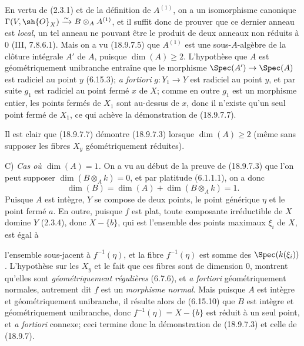 En vertu de (2.3.1) et de la définition de $A^{(1)}$, on a un isomorphisme canonique $\Gamma(V,\sh{O}_X)\xrightarrow{\sim}B\otimes_A A^{(1)}$, et il suffit donc de prouver que ce dernier anneau est \emph{local}, un tel anneau ne pouvant être le produit de deux anneaux non réduits à 0 (III, 7.8.6.1). Mais on a vu (18.9.7.5) que $A^{(1)}$ est une sous-$A$-algèbre de la clôture intégrale $A'$ de $A$, puisque $\dim(A)\geq 2$. L'hypothèse que $A$ est géométriquement unibranche entraîne que le morphisme $\Spec(A')\to\Spec(A)$ est radiciel au point $y$ (6.15.3); \emph{a fortiori} $g:Y_1\to Y$ est radiciel au point $y$, et par suite $g_1$ est radiciel au point fermé $x$ de $X$; comme en outre $g_1$ est un morphisme entier, les points fermés de $X_1$ sont au-dessus de $x$, donc il n'existe qu'un seul point fermé de $X_1$, ce qui achève la démonstration de (18.9.7.7).

Il est clair que (18.9.7.7) démontre (18.9.7.3) lorsque $\dim(A)\geq 2$ (même sans supposer les fibres $X_y$ géométriquement réduites).

C) \emph{Cas où $\dim(A)=1$.} On a vu au début de la preuve de (18.9.7.3) que l'on peut supposer $\dim(B\otimes_A k)=0$, et par platitude (6.1.1.1), on a donc
\[
  \dim(B)=\dim(A)+\dim(B\otimes_A k)=1.
\]
Puisque $A$ est intègre, $Y$ se compose de deux points, le point générique $\eta$ et le point fermé $a$. En outre, puisque $f$ est plat, toute composante irréductible de $X$ domine $Y$ (2.3.4), donc $X-\{b\}$, qui est l'ensemble des points maximaux $\xi_i$ de $X$, est égal à


l'ensemble sous-jacent à $f^{-1}(\eta)$, et la fibre $f^{-1}(\eta)$ est somme des $\Spec(k(\xi_i))$. L'hypothèse sur les $X_y$ et le fait que ces fibres sont de dimension 0, montrent qu'elles sont \emph{géométriquement régulières} (6.7.6), et \emph{a fortiori} géométriquement normales, autrement dit $f$ est un \emph{morphisme normal}. Mais puisque $A$ est intègre et géométriquement unibranche, il résulte alors de (6.15.10) que $B$ est intègre et géométriquement unibranche, donc $f^{-1}(\eta)=X-\{b\}$ est réduit à un seul point, et \emph{a fortiori} connexe; ceci termine donc la démonstration de (18.9.7.3) et celle de (18.9.7).

